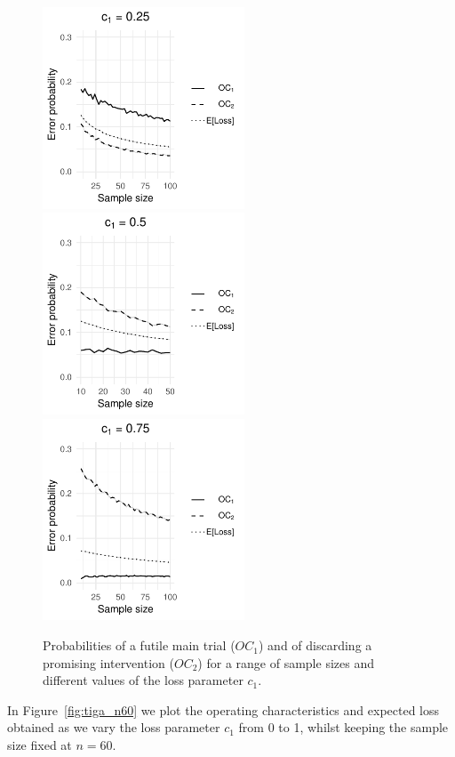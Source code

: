 \documentclass[AMA,STIX1COL]{WileyNJD-v2}
\begin{document}
\begin{figure}
\centering
\includegraphics[height=6cm, trim={0 0 2.5cm 0},clip]{./Figures/tiga_c025}
\includegraphics[height=6cm, trim={0.7cm 0 2.5cm 0},clip]{./Figures/tiga_c05}
\includegraphics[height=6cm, trim={0.7cm 0 0 0},clip]{./Figures/tiga_c075}
\caption{Probabilities of a futile main trial ($OC_1$) and of discarding a promising intervention ($OC_2$) for a range of sample sizes and different values of the loss parameter $c_1$.}
\label{fig:tiga_ocs}
\end{figure}

In Figure~\ref{fig:tiga_n60} we plot the operating characteristics and expected loss obtained as we vary the loss parameter $c_1$ from 0 to 1, whilst keeping the sample size fixed at $n=60$.
\end{document}
